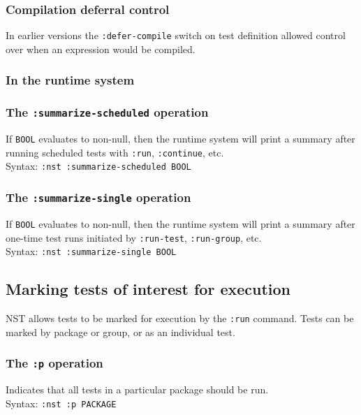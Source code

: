 \subsubsection{Compilation deferral control}
In earlier versions the \texttt{:defer-compile} switch on test
definition allowed control over when an expression would be compiled.

\subsubsection{In the runtime system}

\subsubsection{The \texttt{:summarize-scheduled} operation}
%
If \texttt{BOOL} evaluates to non-null, then the runtime system will
print a summary after running scheduled tests with \texttt{:run},
\texttt{:continue}, etc.
\\ Syntax: \texttt{:nst :summarize-scheduled BOOL}

\subsubsection{The \texttt{:summarize-single} operation}
%
If \texttt{BOOL} evaluates to non-null, then the runtime system will
print a summary after one-time test runs initiated by
\texttt{:run-test}, \texttt{:run-group}, etc.
\\ Syntax: \texttt{:nst :summarize-single BOOL}

\subsection{Marking tests of interest for execution}
\label{nominating-tests}
NST allows tests to be marked for execution by the \texttt{:run}
command.  Tests can be marked by package or group, or as an individual
test.

\subsubsection{The \texttt{:p} operation}
%
Indicates that all tests in a particular package should be run.
\\ Syntax: \texttt{:nst :p PACKAGE}

